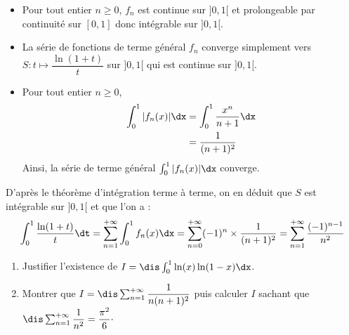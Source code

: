 \documentclass[a4paper,10pt]{report}
\begin{document}
\begin{itemize}
\item Pour tout entier $n \geq 0$, $f_n$ est continue sur $]0,1[$ et prolongeable par continuité sur $[0,1]$ donc intégrable sur $]0,1[$.
\item La série de fonctions de terme général $f_n$ converge simplement vers $S: t \mapsto \dfrac{\ln(1+t)}{t}$ sur $]0,1[$ qui est continue sur $]0,1[$.
\item Pour tout entier $n \geq 0$,
\begin{align*}
\int_0^1 \vert f_n(x) \vert\dx & = \int_0^1 \dfrac{x^n}{n+1} \dx \\
& = \dfrac{1}{(n+1)^2}
\end{align*}
Ainsi, la série de terme général $\int_0^1 \vert f_n(x) \vert\dx$ converge.
\end{itemize}
D'après le théorème d'intégration terme à terme, on en déduit que $S$ est intégrable sur $]0,1[$ et que l'on a :
$$ \int_0^1 \dfrac{\ln(1+t)}{t} \dt = \sum_{n=1}^{+ \infty} \int_0^1 f_n(x) \dx = \sum_{n=0}^{+ \infty} (-1)^{n} \times \dfrac{1}{(n+1)^2} = \sum_{n=1}^{+ \infty} \dfrac{(-1)^{n-1}}{n^2}$$

\begin{Exa}
\begin{enumerate}
\item Justifier l'existence de $I= \dis \int_{0}^1 \ln(x) \ln(1-x) \dx$.
\item Montrer que $I =\dis \sum_{n=1}^{+ \infty} \dfrac{1}{n(n+1)^2}$ puis calculer $I$ sachant que $\dis \sum_{n=1}^{+ \infty} \dfrac{1}{n^2} = \dfrac{\pi^2}{6}\cdot$
\end{enumerate}
\end{Exa}
\end{document}
